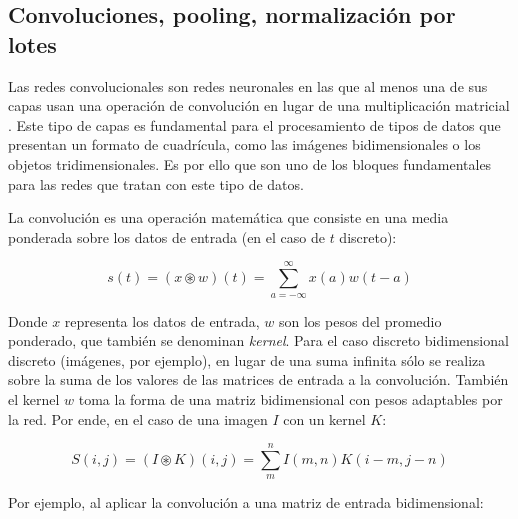 \documentclass[spanish]{article}
\begin{document}
\subsection{Convoluciones, pooling, normalización por lotes}

Las redes convolucionales son redes neuronales en las que al menos una de sus capas
usan una operación de convolución en lugar de una multiplicación matricial
\cite{goodfellow2016deep}. Este tipo de capas es fundamental para el procesamiento
de tipos de datos que presentan un formato de cuadrícula, como las imágenes
bidimensionales o los objetos tridimensionales. Es por ello que son uno de los
bloques fundamentales para las redes que tratan con este tipo de datos.

La convolución es una operación matemática que consiste en una media ponderada sobre
los datos de entrada (en el caso de \(t\) discreto):

\[s(t) = (x \circledast w)(t) = \sum_{a = -\infty}^{\infty} x(a)w(t-a) \]

Donde \(x\) representa los datos de entrada, \(w\) son los pesos del promedio
ponderado, que también se denominan \textit{kernel}.
Para el caso discreto bidimensional discreto (imágenes, por ejemplo), en lugar de
una suma infinita sólo se realiza sobre la suma de los valores de las matrices de
entrada a la convolución. También el kernel \(w\) toma la forma de una matriz
bidimensional con pesos adaptables por la red. Por ende, en el caso de una imagen
\(I\) con un kernel \(K\):

\[S(i,j)=(I \circledast K)(i,j)=\sum_{m}^{n} I(m,n)K(i-m,j-n)\]

Por ejemplo, al aplicar la convolución a una matriz de entrada bidimensional:
\end{document}
